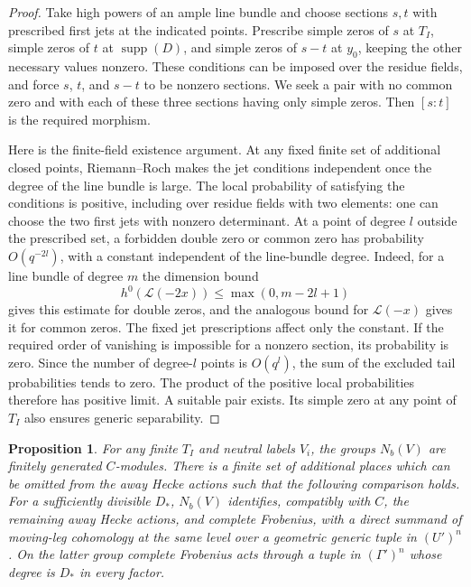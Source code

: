 \documentclass[11pt]{article}
\numberwithin{equation}{section}
\newtheorem{proposition}[theorem]{Proposition}
\theoremstyle{definition}
\theoremstyle{remark}
\newcommand{\supp}{\operatorname{supp}}
\begin{document}
\begin{proof}
Take high powers of an ample line bundle and choose sections $s,t$ with
prescribed first jets at the indicated points.  Prescribe simple zeros
of $s$ at $T_I$, simple zeros of $t$ at $\supp(D)$, and simple zeros of
$s-t$ at $y_0$, keeping the other necessary values nonzero.  These
conditions can be imposed over the residue fields, and force $s$, $t$,
and $s-t$ to be nonzero sections.  We seek a pair with no common zero
and with each of these three sections having only simple zeros.  Then
$[s:t]$ is the required morphism.

Here is the finite-field existence argument.  At any fixed finite set
of additional closed points, Riemann--Roch makes the jet conditions
independent once the degree of the line bundle is large.  The local
probability of satisfying the conditions is positive, including over
residue fields with two elements: one can choose the two first jets
with nonzero determinant.  At a point of degree $l$ outside the
prescribed set, a forbidden double zero or common zero has probability
$O(q^{-2l})$, with a constant independent of the line-bundle degree.
Indeed, for a line bundle of degree $m$ the dimension bound
\[
 h^0(\mathcal L(-2x))\leq\max(0,m-2l+1)
\]
gives this estimate for double zeros, and the analogous bound for
$\mathcal L(-x)$ gives it for common zeros.  The fixed jet prescriptions
affect only the constant.  If the required order of vanishing is
impossible for a nonzero section, its probability is zero.  Since the
number of degree-$l$ points is $O(q^l)$, the sum of the excluded tail
probabilities tends to zero.  The product of the positive local
probabilities therefore has positive limit.  A suitable pair exists.
Its simple zero at any point of $T_I$ also ensures generic separability.
\end{proof}

\begin{proposition}\label{bounds:nearby}
For any finite $T_I$ and neutral labels $V_i$, the groups $N_b(V)$ are
finitely generated $C$-modules.  There is a finite set of additional
places which can be omitted from the away Hecke actions such that the
following comparison holds.  For a sufficiently divisible $D_*$,
$N_b(V)$ identifies, compatibly with $C$, the remaining away Hecke
actions, and complete Frobenius, with a direct summand of moving-leg
cohomology at the same level over a geometric generic tuple in
$(U')^n$.  On the latter group complete Frobenius acts through a tuple
in $(\Gamma')^n$ whose degree is $D_*$ in every factor.
\end{proposition}
\end{document}
